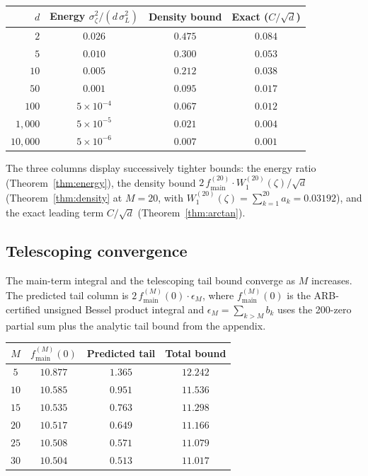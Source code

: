 \documentclass[12pt,reqno]{amsart}
\theoremstyle{plain}
\theoremstyle{definition}
\theoremstyle{remark}
\begin{document}
\begin{center}
\renewcommand{\arraystretch}{1.2}
\begin{tabular}{rccc}
\toprule
$d$ & Energy $\sigma_\zeta^2/(d\,\sigma_L^2)$ & Density bound & Exact ($C/\sqrt{d}$) \\
\midrule
$2$ & $0.026$ & $0.475$ & $0.084$ \\
$5$ & $0.010$ & $0.300$ & $0.053$ \\
$10$ & $0.005$ & $0.212$ & $0.038$ \\
$50$ & $0.001$ & $0.095$ & $0.017$ \\
$100$ & $5\times 10^{-4}$ & $0.067$ & $0.012$ \\
$1{,}000$ & $5\times 10^{-5}$ & $0.021$ & $0.004$ \\
$10{,}000$ & $5\times 10^{-6}$ & $0.007$ & $0.001$ \\
\bottomrule
\end{tabular}
\end{center}

The three columns display successively tighter bounds: the energy ratio (Theorem~\ref{thm:energy}), the density bound $2\,f_{\mathrm{main}}^{(20)}\cdot W_1^{(20)}(\zeta)/\sqrt{d}$ (Theorem~\ref{thm:density} at $M = 20$, with $W_1^{(20)}(\zeta) = \sum_{k=1}^{20} a_k = 0.03192$), and the exact leading term $C/\sqrt{d}$ (Theorem~\ref{thm:arctan}).


\subsection{Telescoping convergence}

The main-term integral and the telescoping tail bound converge as $M$ increases.  The predicted tail column is $2\,f_{\mathrm{main}}^{(M)}(0) \cdot \epsilon_M$, where $f_{\mathrm{main}}^{(M)}(0)$ is the ARB-certified unsigned Bessel product integral and $\epsilon_M = \sum_{k > M} b_k$ uses the 200-zero partial sum plus the analytic tail bound from the appendix.

\begin{center}
\renewcommand{\arraystretch}{1.1}
\begin{tabular}{cccc}
\toprule
$M$ & $f_{\mathrm{main}}^{(M)}(0)$ & Predicted tail & Total bound \\
\midrule
$5$ & $10.877$ & $1.365$ & $12.242$ \\
$10$ & $10.585$ & $0.951$ & $11.536$ \\
$15$ & $10.535$ & $0.763$ & $11.298$ \\
$20$ & $10.517$ & $0.649$ & $11.166$ \\
$25$ & $10.508$ & $0.571$ & $11.079$ \\
$30$ & $10.504$ & $0.513$ & $11.017$ \\
\bottomrule
\end{tabular}
\end{center}
\end{document}
